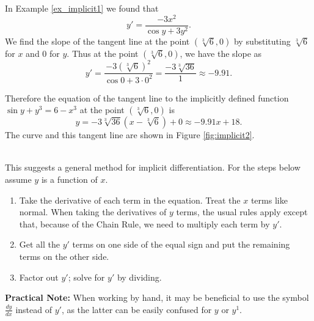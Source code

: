 {In Example \ref{ex_implicit1} we found that $$y' = \frac{-3x^2}{\cos y +3y^2}.$$ We find the slope of the tangent line at the point  $(\sqrt[3]6,0)$ by substituting $\sqrt[3]6$ for $x$ and $0$ for $y$. Thus at the point $(\sqrt[3]6,0)$, we have the slope as $$y' = \frac{-3(\sqrt[3]{6})^2}{\cos 0 + 3\cdot0^2} = \frac{-3\sqrt[3]{36}}{1} \approx -9.91.$$

Therefore the equation of the tangent line to the implicitly defined function $\sin y + y^3=6-x^3$ at the point $(\sqrt[3]{6},0)$ is $$y = -3\sqrt[3]{36}(x-\sqrt[3]{6})+0 \approx -9.91x+18.$$ The curve and this tangent line are shown in Figure \ref{fig:implicit2}.
}\\


This suggests a general method for implicit differentiation.  For the steps below assume $y$ is a function of $x$.
\begin{enumerate}
\item Take the derivative of each term in the equation.  Treat the $x$ terms like normal.  When taking the derivatives of $y$ terms, the usual rules apply except that, because of the Chain Rule, we need to multiply each term by $y'$.
\item Get all the $y'$ terms on one side of the equal sign and put the remaining terms on the other side.
\item Factor out $y'$;  solve for $y'$ by dividing.
\end{enumerate}

\noindent\textbf{Practical Note:} When working by hand, it may be beneficial to use the symbol $\frac{dy}{dx}$ instead of $y'$, as the latter can be easily confused for $y$ or $y^1$.\\

